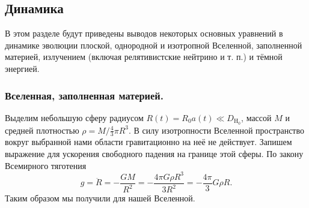 
\subsection{Динамика}
В этом разделе будут приведены  выводов некоторых основных уравнений в динамике эволюции плоской, однородной и изотропной Вселенной, заполненной материей, излучением (включая релятивистские нейтрино и т. п.) и тёмной энергией.
\subsubsection{Вселенная, заполненная материей.}
Выделим небольшую сферу радиусом $R(t) = R_0 a(t) \ll D_{\text{H}_0}$, массой $M$ и средней плотностью $\rho = M / \frac{4}{3} \pi R^3 $. В силу изотропности Вселенной пространство вокруг выбранной нами области гравитационно на неё не действует. Запишем выражение для ускорения свободного падения на границе этой сферы. По закону Всемирного тяготения
\begin{equation}
g = \ddot{R} = -\frac{GM}{R^2} = -\frac{4 \pi G \rho R^3}{3 R^2} = -\frac{4 \pi}{3} G \rho R.
\label{dmov}
\end{equation}
Таким образом мы получили  для нашей Вселенной. 
